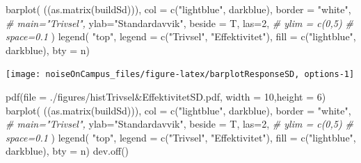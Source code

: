 \documentclass[
]{article}
\newenvironment{Shaded}{\begin{snugshade}}{\end{snugshade}}
\newcommand{\AttributeTok}[1]{\textcolor[rgb]{0.77,0.63,0.00}{#1}}
\newcommand{\CommentTok}[1]{\textcolor[rgb]{0.56,0.35,0.01}{\textit{#1}}}
\newcommand{\DecValTok}[1]{\textcolor[rgb]{0.00,0.00,0.81}{#1}}
\newcommand{\FunctionTok}[1]{\textcolor[rgb]{0.00,0.00,0.00}{#1}}
\newcommand{\NormalTok}[1]{#1}
\newcommand{\StringTok}[1]{\textcolor[rgb]{0.31,0.60,0.02}{#1}}
\begin{document}
\begin{Shaded}
\begin{Highlighting}[]
\FunctionTok{barplot}\NormalTok{(}
\NormalTok{  ((}\FunctionTok{as.matrix}\NormalTok{(buildSd))), }
  \AttributeTok{col =} \FunctionTok{c}\NormalTok{(}\StringTok{"lightblue"}\NormalTok{, }\StringTok{\textquotesingle{}darkblue\textquotesingle{}}\NormalTok{),}
  \AttributeTok{border =} \StringTok{"white"}\NormalTok{,}
  \CommentTok{\# main="Trivsel",}
  \AttributeTok{ylab=}\StringTok{"Standardavvik"}\NormalTok{,}
  \AttributeTok{beside =}\NormalTok{ T,}
  \AttributeTok{las=}\DecValTok{2}\NormalTok{,}
  \CommentTok{\# ylim = c(0,5)}
  \CommentTok{\# space=0.1}
\NormalTok{)}
\FunctionTok{legend}\NormalTok{(}
  \StringTok{"top"}\NormalTok{,}
  \AttributeTok{legend =} \FunctionTok{c}\NormalTok{(}\StringTok{"Trivsel"}\NormalTok{, }\StringTok{"Effektivitet"}\NormalTok{),}
  \AttributeTok{fill =} \FunctionTok{c}\NormalTok{(}\StringTok{"lightblue"}\NormalTok{, }\StringTok{\textquotesingle{}darkblue\textquotesingle{}}\NormalTok{), }\AttributeTok{bty =} \StringTok{\textquotesingle{}n\textquotesingle{}}\NormalTok{)}
\end{Highlighting}
\end{Shaded}

\begin{center}\texttt{[image: noiseOnCampus\_files/figure-latex/barplotResponseSD, options-1]} \end{center}

\begin{Shaded}
\begin{Highlighting}[]
\FunctionTok{pdf}\NormalTok{(}\AttributeTok{file =} \StringTok{\textquotesingle{}./figures/histTrivsel\&EffektivitetSD.pdf\textquotesingle{}}\NormalTok{, }\AttributeTok{width =} \DecValTok{10}\NormalTok{,}\AttributeTok{height =} \DecValTok{6}\NormalTok{)}
\FunctionTok{barplot}\NormalTok{(}
\NormalTok{  ((}\FunctionTok{as.matrix}\NormalTok{(buildSd))), }
  \AttributeTok{col =} \FunctionTok{c}\NormalTok{(}\StringTok{"lightblue"}\NormalTok{, }\StringTok{\textquotesingle{}darkblue\textquotesingle{}}\NormalTok{),}
  \AttributeTok{border =} \StringTok{"white"}\NormalTok{,}
  \CommentTok{\# main="Trivsel",}
  \AttributeTok{ylab=}\StringTok{"Standardavvik"}\NormalTok{,}
  \AttributeTok{beside =}\NormalTok{ T,}
  \AttributeTok{las=}\DecValTok{2}\NormalTok{,}
  \CommentTok{\# ylim = c(0,5)}
  \CommentTok{\# space=0.1}
\NormalTok{)}
\FunctionTok{legend}\NormalTok{(}
  \StringTok{"top"}\NormalTok{,}
  \AttributeTok{legend =} \FunctionTok{c}\NormalTok{(}\StringTok{"Trivsel"}\NormalTok{, }\StringTok{"Effektivitet"}\NormalTok{),}
  \AttributeTok{fill =} \FunctionTok{c}\NormalTok{(}\StringTok{"lightblue"}\NormalTok{, }\StringTok{\textquotesingle{}darkblue\textquotesingle{}}\NormalTok{), }\AttributeTok{bty =} \StringTok{\textquotesingle{}n\textquotesingle{}}\NormalTok{)}
\FunctionTok{dev.off}\NormalTok{()}
\end{Highlighting}
\end{Shaded}
\end{document}
